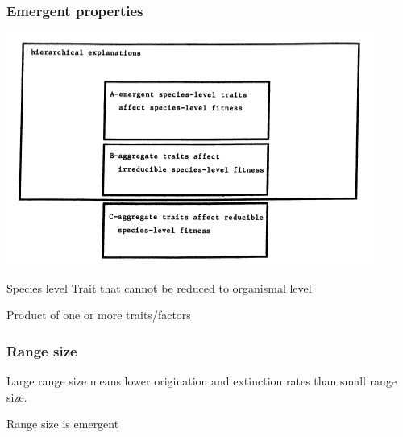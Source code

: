 \documentclass{beamer} \usepackage{amsmath,amsthm}
\begin{document}
\begin{frame}
  \frametitle{Emergent properties}

  \begin{center}
    \includegraphics[height=0.4\textheight, width=\textwidth, keepaspectratio=true]{figure/grantham}

    \tiny{}
  \end{center}

  \begin{block}{Species level}
    Trait that cannot be reduced to organismal level
    
    Product of one or more traits/factors
  \end{block}

\end{frame}

\begin{frame}
  \frametitle{Range size}
  Large range size means lower origination and extinction rates than small range size.

  Range size is emergent

\end{frame}
\end{document}
